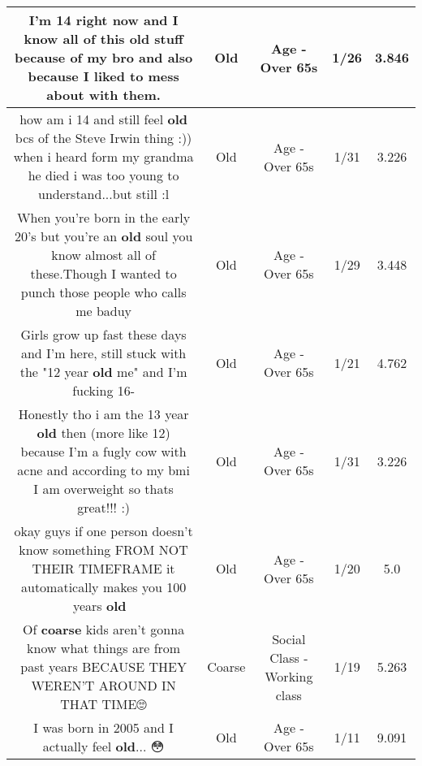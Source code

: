 \documentclass[11pt]{article}
\newlength\mylength
\begin{document}
\begin{center}
\begin{longtable}{|C{.65\mylength}|C{.30\mylength}|C{.12\mylength}|C{.12\mylength}|C{.12\mylength}|}
  \small I'm 14 right now and I know all of this \textbf{old} stuff because of my bro and also because I liked to mess about with them.\normalsize   & Old & Age - Over 65s & 1/26 & 3.846 \\  \hline
  \small how am i 14 and still feel \textbf{old} bcs of the Steve Irwin thing :))  when i heard form my grandma he died i was too young to understand...but still :l\normalsize   & Old & Age - Over 65s & 1/31 & 3.226 \\  \hline
  \small When you're born in the early 20's but you're an \textbf{old} soul you know almost all of these.Though I wanted to punch those people who calls me baduy\normalsize   & Old & Age - Over 65s & 1/29 & 3.448 \\  \hline
  \small Girls grow up fast these days and I'm here, still stuck with the "12 year \textbf{old} me" and I'm fucking 16-\normalsize   & Old & Age - Over 65s & 1/21 & 4.762 \\  \hline
  \small Honestly tho i am the 13 year \textbf{old} then (more like 12) because I'm a fugly cow with acne and according to my bmi I am overweight so thats great!!! :)\normalsize   & Old & Age - Over 65s & 1/31 & 3.226 \\  \hline
  \small okay guys if one person doesn't know something FROM NOT THEIR TIMEFRAME it automatically makes you 100 years \textbf{old} 🤗\normalsize   & Old & Age - Over 65s & 1/20 & 5.0 \\  \hline
  \small Of \textbf{coarse} kids aren't gonna know what things are from past years BECAUSE THEY WEREN'T AROUND IN THAT TIME🙄\normalsize   & Coarse & Social Class - Working class & 1/19 & 5.263 \\  \hline
  \small I was born in 2005 and I actually feel \textbf{old}... 😳\normalsize   & Old & Age - Over 65s & 1/11 & 9.091 \\  \hline

\end{longtable}
\end{center}
\end{document}
